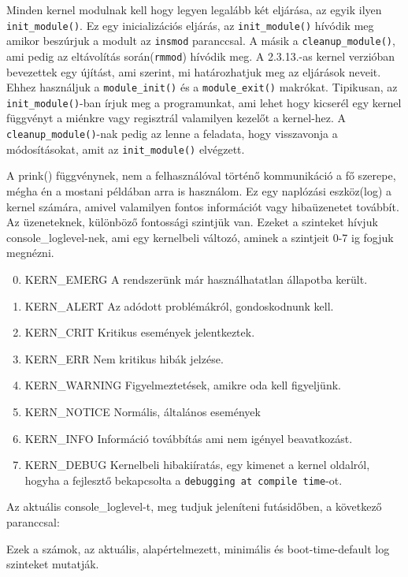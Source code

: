 Minden kernel modulnak kell hogy legyen legalább két eljárása, az egyik ilyen \texttt{init\_module()}.
Ez egy inicializációs eljárás, az \texttt{init\_module()} hívódik meg amikor beszúrjuk a modult az \texttt{insmod} paranccsal.
A másik a \texttt{cleanup\_module()}, ami pedig az eltávolítás során(\texttt{rmmod}) hívódik meg.
A 2.3.13.-as kernel verzióban bevezettek egy újítást, ami szerint, mi határozhatjuk meg az eljárások neveit. Ehhez használjuk a \texttt{module\_init()} és a \texttt{module\_exit()} makrókat. Tipikusan, az \texttt{init\_module()}-ban írjuk meg a programunkat, ami lehet hogy kicserél egy kernel függvényt a miénkre vagy regisztrál valamilyen kezelőt a kernel-hez. A \texttt{cleanup\_module()}-nak pedig az lenne a feladata, hogy visszavonja a módosításokat, amit az \texttt{init\_module()} elvégzett.

A prink() függvénynek, nem a felhasználóval történő kommunikáció a fő szerepe, mégha én a mostani példában arra is használom. Ez egy naplózási eszköz(log) a kernel számára, amivel valamilyen fontos információt vagy hibaüzenetet továbbít. Az üzeneteknek, különböző fontossági szintjük van. Ezeket a szinteket hívjuk console\_loglevel-nek, ami egy kernelbeli változó, aminek a szintjeit 0-7 ig fogjuk megnézni. 
\begin{enumerate}
\setcounter{enumi}{-1}
	\item KERN\_EMERG \- A rendszerünk már használhatatlan állapotba került.
	\item KERN\_ALERT \- Az adódott problémákról, gondoskodnunk kell.
	\item KERN\_CRIT \- Kritikus események jelentkeztek.
	\item KERN\_ERR \- Nem kritikus hibák jelzése.
	\item KERN\_WARNING	\- Figyelmeztetések, amikre oda kell figyeljünk.
	\item KERN\_NOTICE \- Normális, általános események
	\item KERN\_INFO \- Információ továbbítás ami nem igényel beavatkozást.
	\item KERN\_DEBUG \- Kernelbeli hibakiíratás, egy kimenet a kernel oldalról, hogyha a fejlesztő bekapcsolta a \texttt{debugging at compile time}-ot.
\end{enumerate}
Az aktuális console\_loglevel-t, meg tudjuk jeleníteni futásidőben, a következő paranccsal:
Ezek a számok, az aktuális, alapértelmezett, minimális és boot-time-default log szinteket mutatják.







